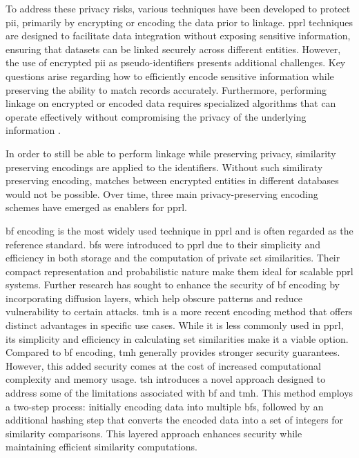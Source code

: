 To address these privacy risks, various techniques have been developed to protect \ac{pii}, primarily by encrypting or encoding the data prior to linkage. 
\ac{pprl} techniques are designed to facilitate data integration without exposing sensitive information, ensuring that datasets can be linked securely across different entities. 
However, the use of encrypted \ac{pii} as pseudo-identifiers presents additional challenges. 
Key questions arise regarding how to efficiently encode sensitive information while preserving the ability to match records accurately. 
Furthermore, performing linkage on encrypted or encoded data requires specialized algorithms that can operate effectively without compromising the privacy of the underlying information \cite{}.

In order to still be able to perform linkage while preserving privacy, similarity preserving encodings are applied to the identifiers.
Without such similiraty preserving encoding, matches between encrypted entities in different databases would not be possible.
Over time, three main privacy-preserving encoding schemes have emerged as enablers for \ac{pprl}. \cite{vidanage2020graph, schaefer2024}

\ac{bf} encoding is the most widely used technique in \ac{pprl} and is often regarded as the reference standard. 
\ac{bf}s were introduced to \ac{pprl} due to their simplicity and efficiency in both storage and the computation of private set similarities. 
Their compact representation and probabilistic nature make them ideal for scalable \ac{pprl} systems.
Further research has sought to enhance the security of \ac{bf} encoding by incorporating diffusion layers, which help obscure patterns and reduce vulnerability to certain attacks. %
\ac{tmh} is a more recent encoding method that offers distinct advantages in specific use cases. 
While it is less commonly used in \ac{pprl}, its simplicity and efficiency in calculating set similarities make it a viable option. 
Compared to \ac{bf} encoding, \ac{tmh} generally provides stronger security guarantees. 
However, this added security comes at the cost of increased computational complexity and memory usage.
\ac{tsh} introduces a novel approach designed to address some of the limitations associated with \ac{bf} and \ac{tmh}. 
This method employs a two-step process: initially encoding data into multiple \ac{bf}s, followed by an additional hashing step that converts the encoded data into a set of integers for similarity comparisons. 
This layered approach enhances security while maintaining efficient similarity computations. \cite{vidanage2020graph, schaefer2024}

